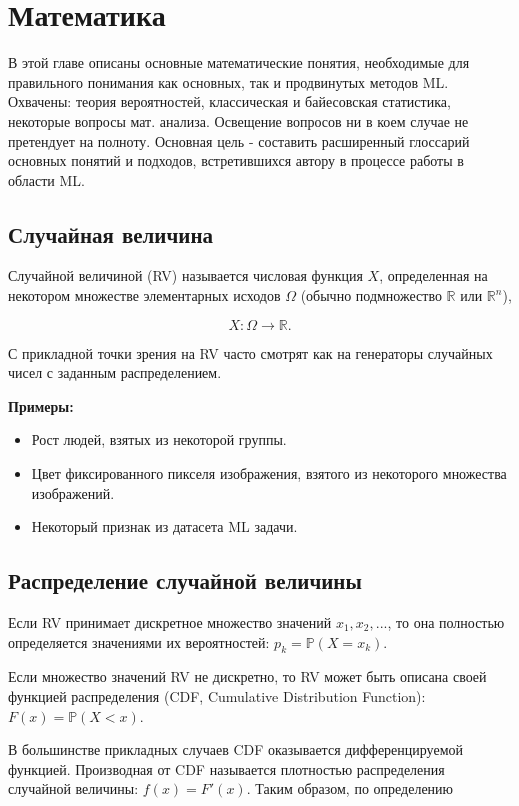 \chapter{Математика}

В этой главе описаны основные математические понятия, необходимые для правильного понимания как основных, так и продвинутых методов ML. Охвачены: теория вероятностей, классическая и байесовская статистика, некоторые вопросы мат. анализа. Освещение вопросов ни в коем случае не претендует на полноту. Основная цель - составить расширенный глоссарий основных понятий и подходов, встретившихся автору в процессе работы в области ML.


\section{Случайная величина}

Случайной величиной (RV) называется числовая функция $X$, определенная на некотором множестве элементарных исходов $\Omega$ (обычно подмножество $\mathbb{R}$ или $\mathbb{R}^n$), 

$$
X: \Omega\rightarrow\mathbb{R}.
$$

С прикладной точки зрения на RV часто смотрят как на генераторы случайных чисел с заданным распределением.

\textbf{Примеры:}
\begin{itemize}
    \item Рост людей, взятых из некоторой группы.
    \item Цвет фиксированного пикселя изображения, взятого из некоторого множества изображений.
    \item Некоторый признак из датасета ML задачи.
\end{itemize}


\section{Распределение случайной величины}

Если RV принимает дискретное множество значений $x_1,x_2,...$, то она полностью определяется значениями их вероятностей: $p_k=\mathbb{P}(X=x_k)$.

Если множество значений RV не дискретно, то RV может быть описана своей функцией распределения (CDF, Cumulative Distribution Function): $F(x)=\mathbb{P}(X<x)$.

В большинстве прикладных случаев CDF оказывается дифференцируемой функцией. Производная от CDF называется плотностью распределения случайной величины: $f(x)=F'(x)$. Таким образом, по определению 

